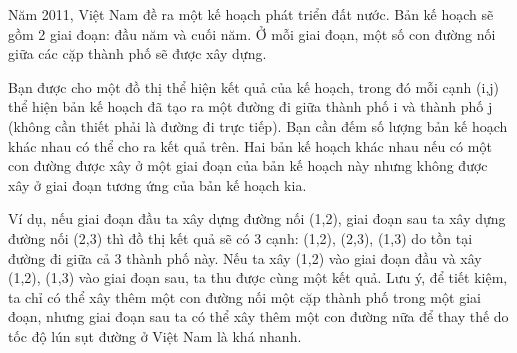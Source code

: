 Năm 2011, Việt Nam đề ra một kế hoạch phát triển đất nước. Bản kế hoạch sẽ gồm 2 giai đoạn: đầu năm và cuối năm. Ở mỗi giai đoạn, một số con đường nối giữa các cặp thành phố sẽ được xây dựng.   





   Bạn được cho một đồ thị thể hiện kết quả của kế hoạch, trong đó mỗi cạnh (i,j) thể hiện bản kế hoạch đã tạo ra một đường đi giữa thành phố i và thành phố j (không cần thiết phải là đường đi trực tiếp). Bạn cần đếm số lượng bản kế hoạch khác nhau có thể cho ra kết quả trên. Hai bản kế hoạch khác nhau nếu có một con đường được xây ở một giai đoạn của bản kế hoạch này nhưng không được xây ở giai đoạn tương ứng của bản kế hoạch kia.   





   Ví dụ, nếu giai đoạn đầu ta xây dựng đường nối (1,2), giai đoạn sau ta xây dựng đường nối (2,3) thì đồ thị kết quả sẽ có 3 cạnh: (1,2), (2,3), (1,3) do tồn tại đường đi giữa cả 3 thành phố này. Nếu ta xây (1,2) vào giai đoạn đầu và xây (1,2), (1,3) vào giai đoạn sau, ta thu được cùng một kết quả. Lưu ý, để tiết kiệm, ta chỉ có thể xây thêm một con đường nối một cặp thành phố trong một giai đoạn, nhưng giai đoạn sau ta có thể xây thêm một con đường nữa để thay thế do tốc độ lún sụt đường ở Việt Nam là khá nhanh.